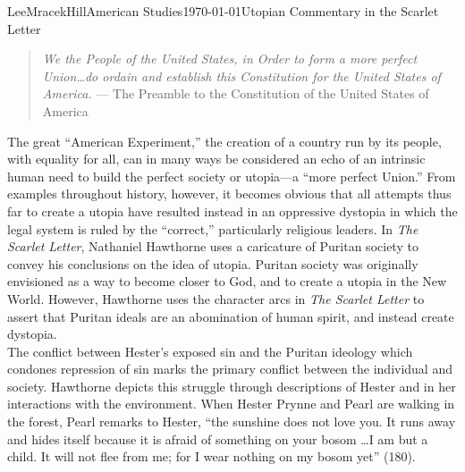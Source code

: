 \documentclass[12pt, letterpaper]{article}
\begin{document}
\begin{mla}{Lee}{Mracek}{Hill}{American Studies}{\today}{Utopian Commentary in the Scarlet Letter}
\begin{quotation}
\textit{We the People of the United States, in Order to form a more perfect Union\ldots do ordain and establish this Constitution for the United States of America.} --- The Preamble to the Constitution of the United States of America
\end{quotation}
        \par The great ``American Experiment,'' the creation of a country run by its people, with equality for all, can in many ways be considered an echo of an intrinsic human need to build the perfect society or utopia---a ``more perfect Union.'' From examples throughout history, however, it becomes obvious that all attempts thus far to create a utopia have resulted instead in an oppressive dystopia in which the legal system is ruled by the ``correct,'' particularly religious leaders. In \textit{The Scarlet Letter}, Nathaniel Hawthorne uses a caricature of Puritan society to convey his conclusions on the idea of utopia. Puritan society was originally envisioned as a way to become closer to God, and to create a utopia in the New World. However, Hawthorne uses the character arcs in \textit{The Scarlet Letter} to assert that Puritan ideals are an abomination of human spirit, and instead create dystopia. \\
        The conflict between Hester’s exposed sin and the Puritan ideology which condones repression of sin marks the primary conflict between the individual and society. Hawthorne depicts this struggle through descriptions of Hester and in her interactions with the environment. When Hester Prynne and Pearl are walking in the forest, Pearl remarks to Hester, ``the sunshine does not love you. It runs away and hides itself because it is afraid of something on your bosom \ldots I am but a child. It will not flee from me; for I wear nothing on my bosom yet'' (180).

\end{mla}
\end{document}
